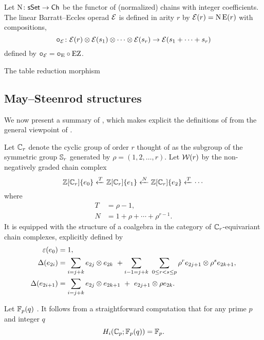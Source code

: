 \sssec

Let $\operatorname{N} \colon \mathsf{sSet} \to \mathsf{Ch}$ be the functor of (normalized) chains with integer coefficients.
The linear Barratt--Eccles operad $\mathcal{E}$ is defined in arity $r$ by $\mathcal{E}(r) = \operatorname{N}\operatorname{E}(r)$ with compositions,
\[
\bm{\circ}_{\mathcal{E}} \colon \mathcal{E}(r) \otimes \mathcal{E}(s_1) \otimes\dotsb\otimes \mathcal{E}(s_r) \to \mathcal{E}(s_1+\dots+s_r)
\]
defined by $\bm{\circ}_{\mathcal{E}} = \bm{\circ}_{\operatorname{E}} \circ \operatorname{EZ}$.

\sssec

The table reduction morphism \TBW

\subsection{May--Steenrod structures}

We now present a summary of \cite{medina2021may_st}, which makes explicit the definitions of \cite{steenrod1953cyclic} from the general viewpoint of \cite{may1970general}.

\sssec\label{sss:minimal resolution}

Let $\mathbb{C}_r$ denote the cyclic group of order $r$ thought of as the subgroup of the symmetric group $\mathbb{S}_r$ generated by $\rho = (1,2,\dots,r)$.
Let $\mathcal{W}(r)$ by the non-negatively graded chain complex
\begin{equation} \label{eq: minimal resolution}
	\mathbb{Z}[\mathbb{C}_r]\{e_0\} \xleftarrow{T} \mathbb{Z}[\mathbb{C}_r]\{e_1\} \xleftarrow{N} \mathbb{Z}[\mathbb{C}_r]\{e_2\} \xleftarrow{T} \cdots
\end{equation}
where
\begin{equation} \label{eq: T and R definition}
	\begin{split}
		T &= \rho - 1, \\
		N &= 1 + \rho + \cdots + \rho^{r-1}.
	\end{split}
\end{equation}
It is equipped with the structure of a coalgebra in the category of $\mathbb{C}_r$-equivariant chain complexes, explicitly defined by
\begin{align*}
	\varepsilon(e_0) &= 1, \\
	\Delta(e_{2i}) &=
	\sum_{i=j+k} e_{2j} \otimes e_{2k} \ + \sum_{i-1=j+k} \ \sum_{0 \leq r < s \leq p} \rho^r e_{2j+1} \otimes \rho^s e_{2k+1}, \\
	\Delta(e_{2i+1}) &=
	\sum_{i=j+k} e_{2j} \otimes e_{2k+1} \ +\ e_{2j+1} \otimes \rho e_{2k}.
\end{align*}

\sssec

Let ${\mathbb{F}_p}(q)$ \TBW.
It follows from a straightforward computation that for any prime $p$ and integer $q$
\begin{equation*}
	H_i(\mathbb{C}_p; {\mathbb{F}_p}(q)) = {\mathbb{F}_p}.
\end{equation*}

